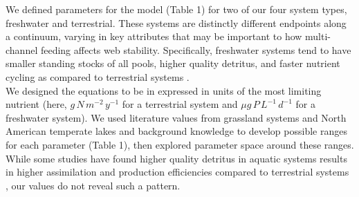 \documentclass[12pt,a4paper,oneside]{article}
\begin{document}
\indent We defined parameters for the model (Table 1) for two of our
four system types, freshwater and
terrestrial. These systems are distinctly different endpoints along a
continuum, varying in key attributes that may be important to how
multi-channel feeding affects web stability. Specifically, freshwater systems
tend to have smaller standing stocks of all pools, higher quality
detritus, and faster nutrient cycling as compared to terrestrial
systems \citep{Cebrian:2004}.
\\ 
\indent We designed the equations to be in
expressed in units of the most limiting nutrient (here, \(g\,N\,m^{-2} \,y^{-1}\)
for a terrestrial system and \(\mu g\,P\, L^{-1}\,d^{-1}\) for a freshwater system). We used literature values from grassland
systems and North American temperate lakes and background knowledge to
develop possible ranges for each parameter (Table 1), then explored
parameter space around
these ranges. While some studies have found higher quality detritus in aquatic systems results in higher assimilation and production efficiencies compared to terrestrial systems \citep{Cebrian:2004,Cebrian:2009hg}, our values do not reveal such a pattern. 
\end{document}
